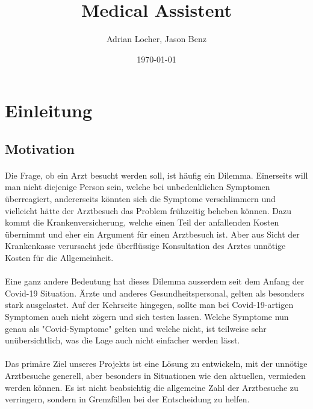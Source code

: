 \documentclass[11pt,a4paper]{article}
\title{Medical Assistent}
\author{Adrian Locher, Jason Benz}
\date{\today}
\begin{document}
\maketitle
\tableofcontents
\newpage


\section{Einleitung}
    \subsection{Motivation}
        \paragraph{}
            Die Frage, ob ein Arzt besucht werden soll, ist häufig ein Dilemma.
            Einerseits will man nicht diejenige Person sein, welche bei unbedenklichen Symptomen
            überreagiert, andererseits könnten sich die Symptome verschlimmern und vielleicht
            hätte der Arztbesuch das Problem frühzeitig beheben können. Dazu kommt die
            Krankenversicherung, welche einen Teil der anfallenden Kosten übernimmt und eher ein Argument
            für einen Arztbesuch ist. Aber aus Sicht der Krankenkasse verursacht jede überflüssige
            Konsultation des Arztes unnötige Kosten für die Allgemeinheit.
            
        \paragraph{}
            Eine ganz andere Bedeutung hat dieses Dilemma ausserdem seit dem Anfang
            der Covid-19 Situation. Ärzte und anderes Gesundheitspersonal, gelten als besonders
            stark ausgelastet. Auf der Kehrseite hingegen, sollte man bei Covid-19-artigen Symptomen
            auch nicht zögern und sich testen lassen. Welche Symptome nun genau als "Covid-Symptome"
            gelten und welche nicht, ist teilweise sehr unübersichtlich, was die Lage auch nicht
            einfacher werden lässt.

        \paragraph{}
            Das primäre Ziel unseres Projekts ist eine Lösung zu entwickeln, mit der unnötige Arztbesuche
            generell, aber besonders in Situationen wie den aktuellen, vermieden werden können.
            Es ist nicht beabsichtig die allgemeine Zahl der Arztbesuche zu verringern, sondern in
            Grenzfällen bei der Entscheidung zu helfen.
        
\end{document}
